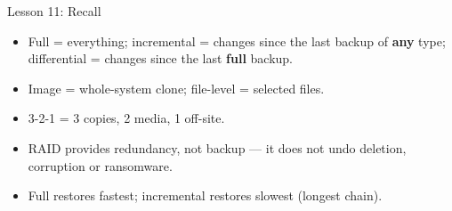 \documentclass[aspectratio=169]{beamer}
\begin{document}
\begin{frame}{Lesson 11: Recall}
  \begin{itemize}
    \item Full = everything; incremental = changes since the last backup of
      \textbf{any} type; differential = changes since the last \textbf{full}
      backup.
    \item Image = whole-system clone; file-level = selected files.
    \item 3-2-1 = 3 copies, 2 media, 1 off-site.
    \item RAID provides redundancy, not backup --- it does not undo deletion,
      corruption or ransomware.
    \item Full restores fastest; incremental restores slowest (longest
      chain).
  \end{itemize}
\end{frame}
\end{document}
